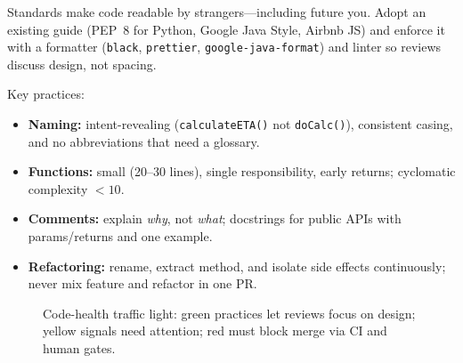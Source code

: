 Standards make code readable by strangers---including future you. Adopt an existing guide (PEP~8 for Python, Google Java Style, Airbnb JS) and enforce it with a formatter (\texttt{black}, \texttt{prettier}, \texttt{google-java-format}) and linter so reviews discuss design, not spacing.

Key practices:
\begin{itemize}
    \item \textbf{Naming:} intent-revealing (\texttt{calculateETA()} not \texttt{doCalc()}), consistent casing, and no abbreviations that need a glossary.
    \item \textbf{Functions:} small (20--30 lines), single responsibility, early returns; cyclomatic complexity $<10$.
    \item \textbf{Comments:} explain \emph{why}, not \emph{what}; docstrings for public APIs with params/returns and one example.
    \item \textbf{Refactoring:} rename, extract method, and isolate side effects continuously; never mix feature and refactor in one PR.
\end{itemize}

\begin{figure}[h]
\centering
{}
\caption{Code-health traffic light: green practices let reviews focus on design; yellow signals need attention; red must block merge via CI and human gates.}
\label{fig:code-health}
\end{figure}

